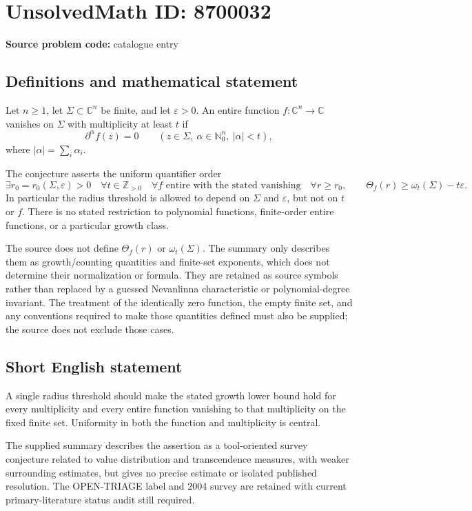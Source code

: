 \documentclass[11pt]{article}
\newcommand{\N}{\mathbb{N}}
\newcommand{\Z}{\mathbb{Z}}
\newcommand{\C}{\mathbb{C}}
\begin{document}
\section*{UnsolvedMath ID: 8700032}
\textbf{Source problem code:} catalogue entry
\subsection{Definitions and mathematical statement}
Let $n\ge1$, let $\Sigma\subset\C^n$ be finite, and let $\varepsilon>0$. An entire function $f:\C^n\to\C$ vanishes on $\Sigma$ with multiplicity at least $t$ if
\[
 \partial^\alpha f(z)=0\qquad
 (z\in\Sigma,\ \alpha\in\N_0^n,\ |\alpha|<t),
\]
where $|\alpha|=\sum_i\alpha_i$.

The conjecture asserts the uniform quantifier order
\[
 \exists r_0=r_0(\Sigma,\varepsilon)>0\quad
 \forall t\in\Z_{>0}\quad
 \forall f\text{ entire with the stated vanishing}\quad
 \forall r\ge r_0,
 \qquad
 \Theta_f(r)\ge\omega_t(\Sigma)-t\varepsilon.
\]
In particular the radius threshold is allowed to depend on $\Sigma$ and $\varepsilon$, but not on $t$ or $f$. There is no stated restriction to polynomial functions, finite-order entire functions, or a particular growth class.

The source does not define $\Theta_f(r)$ or $\omega_t(\Sigma)$. The summary only describes them as growth/counting quantities and finite-set exponents, which does not determine their normalization or formula. They are retained as source symbols rather than replaced by a guessed Nevanlinna characteristic or polynomial-degree invariant. The treatment of the identically zero function, the empty finite set, and any conventions required to make those quantities defined must also be supplied; the source does not exclude those cases.
\subsection{Short English statement}
A single radius threshold should make the stated growth lower bound hold for every multiplicity and every entire function vanishing to that multiplicity on the fixed finite set. Uniformity in both the function and multiplicity is central.

The supplied summary describes the assertion as a tool-oriented survey conjecture related to value distribution and transcendence measures, with weaker surrounding estimates, but gives no precise estimate or isolated published resolution. The OPEN-TRIAGE label and 2004 survey are retained with current primary-literature status audit still required.
\end{document}
